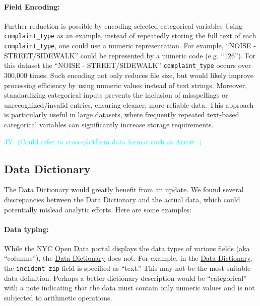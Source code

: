 \documentclass[linenumber]{jdsart}
\newcommand{\jy}[1]{\textcolor{cyan}{JY: (#1)}}
\begin{document}
\paragraph{Field Encoding:} Further reduction is possible 
by encoding selected categorical variables 
Using \texttt{complaint\_type} as an example,
instead of repeatedly storing the full text of each \texttt{complaint\_type}, 
one could use a numeric representation. For example, 
``NOISE - STREET/SIDEWALK'' could be represented by a 
numeric code (e.g. ``126''). For this dataset the 
``NOISE - STREET/SIDEWALK'' \texttt{complaint\_type} occurs 
over 300,000 times. Such encoding not only reduces file 
size, but would likely improve processing efficiency by using numeric
values instead of text strings. Moreover, standardizing 
categorical inputs prevents the inclusion of misspellings 
or unrecognized/invalid entries, ensuring cleaner, more reliable 
data. This approach is particularly useful in large datasets, where 
frequently repeated text\mbox{-}based categorical variables can 
significantly increase storage requirements.

\jy{Could refer to cross-plotform data format such as Arrow
  \citep{bates2024csv}.}


\subsection{Data Dictionary} 
\label{sec:datadictionary}

The \href{https://data.cityofnewyork.us/api/views/erm2-nwe9/files/b372b884-f86a-453b-ba16-1fe06ce9d212?download=true&filename=311_ServiceRequest_2010-Present_DataDictionary_Updated_2023.xlsx}{Data Dictionary} would greatly benefit from an update. We found several discrepancies between the 
Data Dictionary and the actual data, which could potentially 
mislead analytic efforts. Here are some examples:

\paragraph{Data typing:} While the NYC Open Data portal displays the data types of 
various fields (aka ``columns''), the \href{https://data.cityofnewyork.us/api/views/erm2-nwe9/files/b372b884-f86a-453b-ba16-1fe06ce9d212?download=true&filename=311_ServiceRequest_2010-Present_DataDictionary_Updated_2023.xlsx}{Data Dictionary} does 
not. For example, in the \href{https://data.cityofnewyork.us/api/views/erm2-nwe9/files/b372b884-f86a-453b-ba16-1fe06ce9d212?download=true&filename=311_ServiceRequest_2010-Present_DataDictionary_Updated_2023.xlsx}{Data Dictionary}, 
the \texttt{incident\_zip} field is specified as ``text.'' This may 
not be the most suitable data definition. Perhaps a better 
dictionary description would be  ``categorical'' with a note 
indicating that the data must contain only numeric values 
and is not subjected to arithmetic operations.
\end{document}
